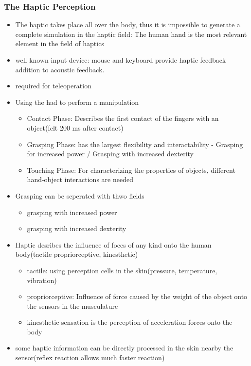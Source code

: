 \documentclass{standalone}
\begin{document}
\subsubsection{The Haptic Perception}
\begin{itemize}
	\item The haptic takes place all over the body, thus it is impossible to generate a complete simulation in the haptic field: The human hand is the most relevant element in the field of haptics
	\item well known input device: mouse and keyboard provide haptic feedback addition to acoustic feedback.
	\item required for teleoperation
	\item Using the had to perform a manipulation
	\begin{itemize}
		\item Contact Phase: Describes the first contact of the fingers with an object(felt 200 ms after contact)
		\item Grasping Phase: has the largest flexibility and interactability
		- Grasping for increased power / Grasping with increased dexterity
		\item Touching Phase: For characterizing the properties of objects, different hand-object interactions are needed
	\end{itemize}
	\item Grasping can be seperated with thwo fields
	\begin{itemize}
		\item grasping with increased power
		\item grasping with increased dexterity
	\end{itemize}
	\item Haptic desribes the influence of foces of any kind onto the human body(tactile propriorceptive, kinesthetic)
	\begin{itemize}
		\item tactile: using perception cells in the skin(pressure, temperature, vibration)
		\item propriorceptive: Influence of force caused by the weight of the object onto the sensors in the musculature
		\item kinesthetic sensation is the perception of acceleration forces onto the body 
	\end{itemize}
	\item some haptic information can be directly processed in the skin nearby the sensor(reflex reaction allows much faster reaction)
\end{itemize}
\end{document}

